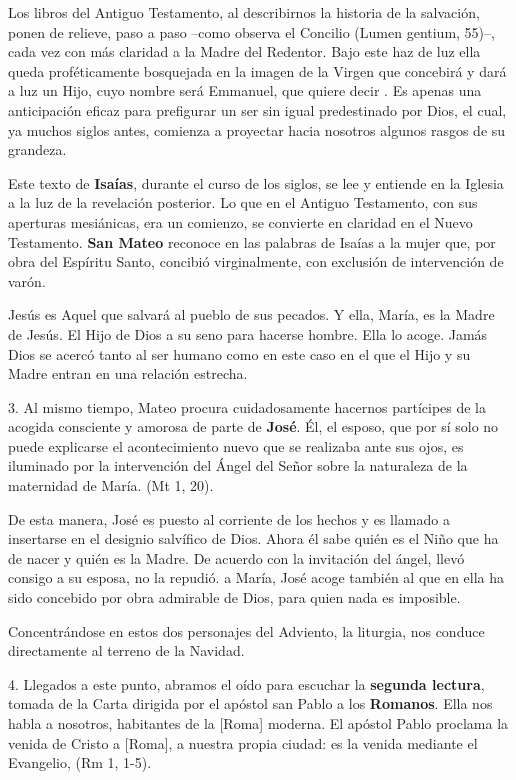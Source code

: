Los libros del Antiguo Testamento, al describirnos la historia de la salvación, ponen de relieve, paso a paso --como observa el Concilio (Lumen gentium, 55)--, cada vez con más claridad a la Madre del Redentor. Bajo este haz de luz ella queda proféticamente bosquejada en la imagen de la Virgen que concebirá y dará a luz un Hijo, cuyo nombre será Emmanuel, que quiere decir . Es apenas una anticipación eficaz para prefigurar un ser sin igual predestinado por Dios, el cual, ya muchos siglos antes, comienza a proyectar hacia nosotros algunos rasgos de su grandeza.

Este texto de \textbf{Isaías}, durante el curso de los siglos, se lee y entiende en la Iglesia a la luz de la revelación posterior. Lo que en el Antiguo Testamento, con sus aperturas mesiánicas, era un comienzo, se convierte en claridad en el Nuevo Testamento. \textbf{San Mateo} reconoce en las palabras de Isaías a la mujer que, por obra del Espíritu Santo, concibió virginalmente, con exclusión de intervención de varón.

Jesús es Aquel que salvará al pueblo de sus pecados. Y ella, María, es la Madre de Jesús. El Hijo de Dios  a su seno para hacerse hombre. Ella lo acoge. Jamás Dios se acercó tanto al ser humano como en este caso en el que el Hijo y su Madre entran en una relación estrecha.

3. Al mismo tiempo, Mateo procura cuidadosamente hacernos partícipes de la acogida consciente y amorosa de parte de \textbf{José}. Él, el esposo, que por sí solo no puede explicarse el acontecimiento nuevo que se realizaba ante sus ojos, es iluminado por la intervención del Ángel del Señor sobre la naturaleza de la maternidad de María.  (Mt 1, 20).

De esta manera, José es puesto al corriente de los hechos y es llamado a insertarse en el designio salvífico de Dios. Ahora él sabe quién es el Niño que ha de nacer y quién es la Madre. De acuerdo con la invitación del ángel, llevó consigo a su esposa, no la repudió.  a María, José acoge también al que en ella ha sido concebido por obra admirable de Dios, para quien nada es imposible.

Concentrándose en estos dos personajes del Adviento, la liturgia, nos conduce directamente al terreno de la Navidad.

4. Llegados a este punto, abramos el oído para escuchar la \textbf{segunda lectura}, tomada de la Carta dirigida por el apóstol san Pablo a los \textbf{Romanos}. Ella nos habla a nosotros, habitantes de la {[}Roma{]} moderna. El apóstol Pablo proclama la venida de Cristo a {[}Roma{]}, a nuestra propia ciudad: es la venida mediante el Evangelio,  (Rm 1, 1-5).

